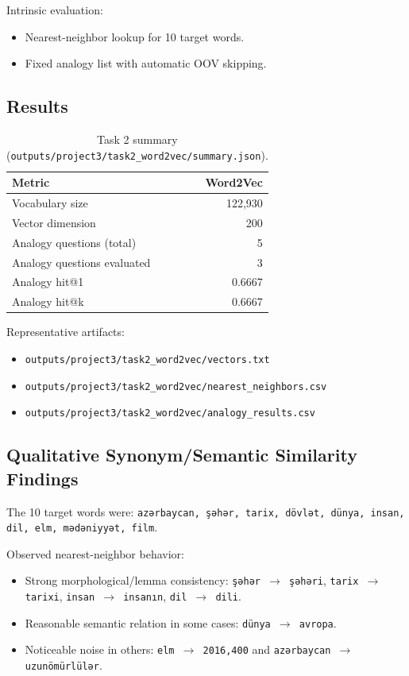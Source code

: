 \documentclass[11pt]{article}
\newcommand{\wTwoVocab}{122{,}930}
\newcommand{\wTwoDim}{200}
\newcommand{\wTwoHitK}{0.6667}
\newcommand{\wTwoEval}{3}
\begin{document}
Intrinsic evaluation:
\begin{itemize}
    \item Nearest-neighbor lookup for 10 target words.
    \item Fixed analogy list with automatic OOV skipping.
\end{itemize}

\subsection{Results}
\begin{table}[H]
\centering
\begin{tabular}{lr}
\toprule
\textbf{Metric} & \textbf{Word2Vec} \\
\midrule
Vocabulary size & \wTwoVocab \\
Vector dimension & \wTwoDim \\
Analogy questions (total) & 5 \\
Analogy questions evaluated & \wTwoEval \\
Analogy hit@1 & 0.6667 \\
Analogy hit@k & \wTwoHitK \\
\bottomrule
\end{tabular}
\caption{Task 2 summary (\texttt{outputs/project3/task2\_word2vec/summary.json}).}
\label{tab:task2-summary}
\end{table}

Representative artifacts:
\begin{itemize}
    \item \texttt{outputs/project3/task2\_word2vec/vectors.txt}
    \item \texttt{outputs/project3/task2\_word2vec/nearest\_neighbors.csv}
    \item \texttt{outputs/project3/task2\_word2vec/analogy\_results.csv}
\end{itemize}

\subsection{Qualitative Synonym/Semantic Similarity Findings}
The 10 target words were:
\texttt{azərbaycan, şəhər, tarix, dövlət, dünya, insan, dil, elm, mədəniyyət, film}.

Observed nearest-neighbor behavior:
\begin{itemize}
    \item Strong morphological/lemma consistency: \texttt{şəhər $\rightarrow$ şəhəri}, \texttt{tarix $\rightarrow$ tarixi}, \texttt{insan $\rightarrow$ insanın}, \texttt{dil $\rightarrow$ dili}.
    \item Reasonable semantic relation in some cases: \texttt{dünya $\rightarrow$ avropa}.
    \item Noticeable noise in others: \texttt{elm $\rightarrow$ 2016,400} and \texttt{azərbaycan $\rightarrow$ uzunömürlülər}.
\end{itemize}
\end{document}
